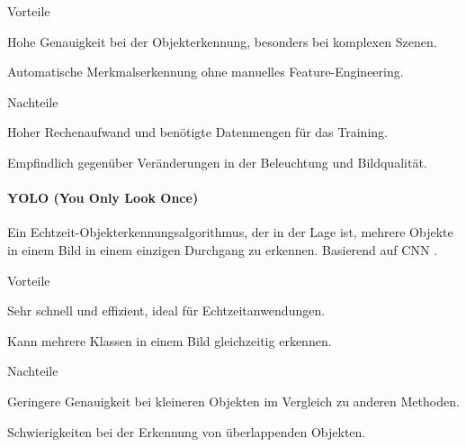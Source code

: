 \documentclass[../main.tex]{subfiles}
\begin{document}
\begin{minipage}[t]{0.48\textwidth}
\begin{items}
  \item [Vorteile]
  \item Hohe Genauigkeit bei der Objekterkennung, besonders bei komplexen Szenen.
  \item Automatische Merkmalserkennung ohne manuelles Feature-Engineering.
\end{items}
\end{minipage}
\hfill
\begin{minipage}[t]{0.48\textwidth}
\begin{items}
  \item [Nachteile]
  \item Hoher Rechenaufwand und benötigte Datenmengen für das Training.
  \item Empfindlich gegenüber Veränderungen in der Beleuchtung und Bildqualität.
\end{items}
\end{minipage}

\paragraph{YOLO (You Only Look Once)}

Ein Echtzeit-Objekterkennungsalgorithmus, der in der Lage ist, mehrere Objekte in einem Bild in einem einzigen Durchgang zu erkennen. Basierend auf CNN \cite{yolo}.

\begin{minipage}[t]{0.48\textwidth}
\begin{items}
  \item [Vorteile]
  \item Sehr schnell und effizient, ideal für Echtzeitanwendungen.
  \item Kann mehrere Klassen in einem Bild gleichzeitig erkennen.
\end{items}
\end{minipage}
\hfill
\begin{minipage}[t]{0.48\textwidth}
\begin{items}
  \item [Nachteile]
  \item Geringere Genauigkeit bei kleineren Objekten im Vergleich zu anderen Methoden.
  \item Schwierigkeiten bei der Erkennung von überlappenden Objekten.
\end{items}
\end{minipage}
\end{document}
